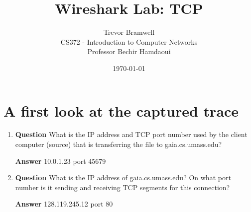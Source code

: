 \documentclass[12pt,letterpaper]{article}
\title{Wireshark Lab: TCP}
\author{
    Trevor Bramwell \\
    CS372 - Introduction to Computer Networks \\
    Professor Bechir Hamdaoui
}
\date{\today}
\newcommand{\q}{\textbf{Question} }
\newcommand{\ans}{\textbf{Answer} }
\begin{document}
\maketitle

\setcounter{section}{1}
\section{A first look at the captured trace}
\begin{enumerate}
\item \q What is the IP address and TCP port number used by the client computer
(source) that is transferring the file to gaia.cs.umass.edu? 

\ans 10.0.1.23 port 45679

\item \q What is the IP address of gaia.cs.umass.edu? On what port number is it
sending and receiving TCP segments for this connection?

\ans 128.119.245.12 port 80

\end{enumerate}



\pagebreak
\end{document}
